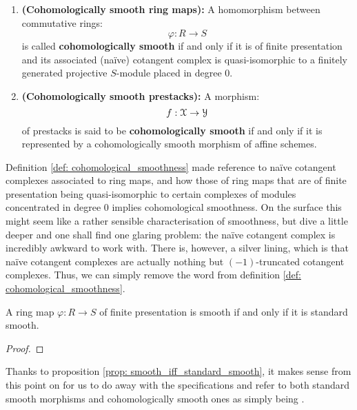                 \begin{definition} \label{def: cohomological_smoothness} 
                    \noindent
                    \begin{enumerate}
                        \item \textbf{(Cohomologically smooth ring maps):} A homomorphism between commutative rings:
                            $$\varphi: R \to S$$
                        is called \textbf{cohomologically smooth} if and only if it is of finite presentation and its associated (na\"ive) cotangent complex is quasi-isomorphic to a finitely generated projective $S$-module placed in degree $0$.
                        \item \textbf{(Cohomologically smooth prestacks):} A morphism:
                            $$f: \mathcal{X} \to \mathcal{Y}$$
                        of prestacks is said to be \textbf{cohomologically smooth} if and only if it is represented by a cohomologically smooth morphism of affine schemes.
                    \end{enumerate}
                \end{definition}
                \begin{remark}
                    Definition \ref{def: cohomological_smoothness} made reference to na\"ive cotangent complexes associated to ring maps, and how those of ring maps that are of finite presentation being quasi-isomorphic to certain complexes of modules concentrated in degree $0$ implies cohomological smoothness. On the surface this might seem like a rather sensible characterisation of smoothness, but dive a little deeper and one shall find one glaring problem: the na\"ive cotangent complex is incredibly awkward to work with. There is, however, a silver lining, which is that na\"ive cotangent complexes are actually nothing but $(-1)$-truncated cotangent complexes. Thus, we can simply remove the word  from definition \ref{def: cohomological_smoothness}. 
                \end{remark}
                
                \begin{proposition} \label{prop: smooth_iff_standard_smooth}
                    A ring map $\varphi: R \to S$ of finite presentation is smooth if and only if it is standard smooth.
                \end{proposition}
                    \begin{proof}
                    
                    \end{proof} 
                \begin{convention}
                    Thanks to proposition \ref{prop: smooth_iff_standard_smooth}, it makes sense from this point on for us to do away with the specifications and refer to both standard smooth morphisms and cohomologically smooth ones as simply being .
                \end{convention}
                    
